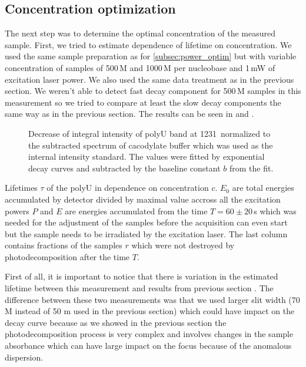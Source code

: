 \subsection{Concentration optimization}

The next step was to determine the optimal concentration of the measured
sample. First, we tried to estimate dependence of lifetime on concentration. We
used the same sample preparation as for
\cref{subsec:power_optim}
but with variable concentration of samples of 500\,M and 1000\,M per
nucleobase and 1\,mW of excitation laser power. We also used the same data
treatment as in the previous section. We weren't able to detect fast decay
component for 500\,M samples in this measurement so we tried to compare
at least the slow decay components the same way as in the previous section.
The results can be seen in
and
.

\begin{figure}
	\centering
	
	\caption{Decrease of integral intensity of polyU band at 1231\,\icm{}
		normalized to the subtracted spectrum of cacodylate buffer which was used
		as the internal intensity standard. The values were fitted by exponential
		decay curves  and subtracted by the baseline
		constant $b$ from the fit.}
	\label{\figlabel{conc_optim:triplexes}}
\end{figure}

\begin{table}
	\centering
	
	\caption{Lifetimes $\tau$ of the polyU in dependence on concentration
		$c$. $E_0$ are total energies accumulated by detector divided by maximal
		value accross all the excitation powers $P$ and $E$ are energies
		accumulated from the time $T = 60\pm20$\,s which was needed for the
		adjustment of the samples before the acquisition can even start but
		the sample needs to be irradiated by the excitation laser. The last column
		contains fractions of the samples $r$ which were not destroyed by
		photodecomposition after the time $T$.
	}
	\label{\tablabel{conc_optim:lifetimes_triplexes}}
\end{table}

First of all, it is important to notice that there is variation in the
estimated lifetime between this measurement and results from previous section
. The difference between these two
measurements was that we used larger slit width (70 M instead of 50 m
used in the previous section) which could have impact on the decay curve
because as we showed in the previous section the photodecomposition process
is very complex and involves changes in the sample absorbance which can have
large impact on the focus because of the anomalous dispersion.


